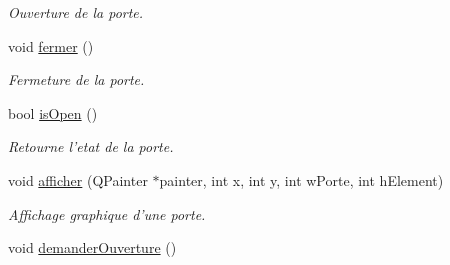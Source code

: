 \begin{DoxyCompactItemize}
\begin{DoxyCompactList}\small\item\em Ouverture de la porte. \item\end{DoxyCompactList}\item 
\hypertarget{classPorte_a3718ae4efe9d301d94fda91040764114}{
void \hyperlink{classPorte_a3718ae4efe9d301d94fda91040764114}{fermer} ()}
\label{classPorte_a3718ae4efe9d301d94fda91040764114}

\begin{DoxyCompactList}\small\item\em Fermeture de la porte. \item\end{DoxyCompactList}\item 
\hypertarget{classPorte_aed677d56fb34ab8ed8c9beb6e338452a}{
bool \hyperlink{classPorte_aed677d56fb34ab8ed8c9beb6e338452a}{isOpen} ()}
\label{classPorte_aed677d56fb34ab8ed8c9beb6e338452a}

\begin{DoxyCompactList}\small\item\em Retourne l'etat de la porte. \item\end{DoxyCompactList}\item 
void \hyperlink{classPorte_a612d63b6b888d391ac7ab3530cb6fecb}{afficher} (QPainter $\ast$painter, int x, int y, int wPorte, int hElement)
\begin{DoxyCompactList}\small\item\em Affichage graphique d'une porte. \item\end{DoxyCompactList}\item 
\hypertarget{classPorte_a27ff96c2b4acc8d223d744ecd31aa3a3}{
void \hyperlink{classPorte_a27ff96c2b4acc8d223d744ecd31aa3a3}{demanderOuverture} ()}
\label{classPorte_a27ff96c2b4acc8d223d744ecd31aa3a3}


\end{DoxyCompactItemize}
